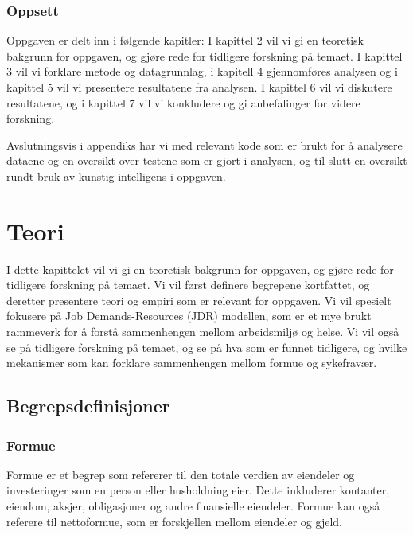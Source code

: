 \documentclass[
  12pt,
  a4paper,
  DIV=11,
  numbers=noendperiod]{scrartcl}
\begin{document}
\subsubsection{Oppsett}\label{oppsett}

Oppgaven er delt inn i følgende kapitler: I kapittel 2 vil vi gi en
teoretisk bakgrunn for oppgaven, og gjøre rede for tidligere forskning
på temaet. I kapittel 3 vil vi forklare metode og datagrunnlag, i
kapitell 4 gjennomføres analysen og i kapittel 5 vil vi presentere
resultatene fra analysen. I kapittel 6 vil vi diskutere resultatene, og
i kapittel 7 vil vi konkludere og gi anbefalinger for videre forskning.

Avslutningsvis i appendiks har vi med relevant kode som er brukt for å
analysere dataene og en oversikt over testene som er gjort i analysen,
og til slutt en oversikt rundt bruk av kunstig intelligens i oppgaven.

\newpage

\section{Teori}\label{teori}

I dette kapittelet vil vi gi en teoretisk bakgrunn for oppgaven, og
gjøre rede for tidligere forskning på temaet. Vi vil først definere
begrepene kortfattet, og deretter presentere teori og empiri som er
relevant for oppgaven. Vi vil spesielt fokusere på Job Demands-Resources
(JDR) modellen, som er et mye brukt rammeverk for å forstå sammenhengen
mellom arbeidsmiljø og helse. Vi vil også se på tidligere forskning på
temaet, og se på hva som er funnet tidligere, og hvilke mekanismer som
kan forklare sammenhengen mellom formue og sykefravær.

\subsection{Begrepsdefinisjoner}\label{begrepsdefinisjoner}

\subsubsection{Formue}\label{formue}

Formue er et begrep som refererer til den totale verdien av eiendeler og
investeringer som en person eller husholdning eier. Dette inkluderer
kontanter, eiendom, aksjer, obligasjoner og andre finansielle eiendeler.
Formue kan også referere til nettoformue, som er forskjellen mellom
eiendeler og gjeld.
\end{document}
